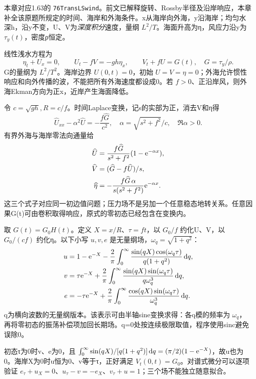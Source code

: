 本章对应1.63的 \texttt{76TransLSwind}。前文已解释旋转、Rossby半径及沿岸响应，本章补全该原题所规定的时间、海岸和外海条件。x从海岸向外海，y沿海岸；均匀水深h，沿y不变，U、V为\emph{深度积分}速度，量纲 $L^2/T$。海面升高为η，风应力沿y为 $\tau_y(t)$，密度ρ恒定。

线性浅水方程为
\[
 \eta_t+U_x=0,\qquad U_t-fV=-gh\eta_x,
 \qquad V_t+fU=G(t),\quad G=\tau_y/\rho.
\]
G的量纲为 $L^2/T^2$。海岸边界 $U(0,t)=0$，初始 $U=V=\eta=0$；外海允许惯性响应和向外传播的波，不能把所有外海速度都设成0。若 $f>0$、正沿岸风，则外海Ekman方向为正x，近岸产生海面降低。

令 $c=\sqrt{gh},R=c/f$。时间Laplace变换，记s的实部为正，消去V和η得
\[
 \widehat U_{xx}-\alpha^2\widehat U=-\frac{f\widehat G}{c^2},\quad
 \alpha=\sqrt{s^2+f^2}/c,\quad\Re\alpha>0.
\]
有界外海与海岸零法向通量给
\begin{align*}
 \widehat U&=\frac{f\widehat G}{s^2+f^2}(1-\mathrm e^{-\alpha x}),\\
 \widehat V&=(\widehat G-f\widehat U)/s,\\
 \widehat\eta&=-\frac{f\widehat G\,\alpha}{s(s^2+f^2)}\mathrm e^{-\alpha x}.
\end{align*}
这三个式子对应同一初边值问题；压力场不是另加一个任意稳态地转关系。任意因果G(t)可由卷积取得响应，原式的零初态已经包含在变换内。

取 $G(t)=G_0H(t)$。定义 $X=x/R$、$\tau=ft$，以 $G_0/f$ 约化U、V，以 $G_0/(cf)$ 约化η。以下小写 $u,v,e$ 是无量纲场，$\omega_q=\sqrt{1+q^2}$：
\begin{align*}
 u&=1-\mathrm e^{-X}-\frac2\pi\int_0^\infty
        \frac{\sin(qX)\cos(\omega_q\tau)}{q(1+q^2)}\,\mathrm d q,\\
 v&=\tau\mathrm e^{-X}+\frac2\pi\int_0^\infty
        \frac{\sin(qX)\sin(\omega_q\tau)}{q\omega_q^3}\,\mathrm d q,\\
 e&=-\tau\mathrm e^{-X}+\frac2\pi\int_0^\infty
        \frac{\cos(qX)\sin(\omega_q\tau)}{\omega_q^3}\,\mathrm d q.
\end{align*}
q为横向波数的无量纲版本。该表示可由半轴sine变换求得：各q模的频率为 $\omega_q$，再将零初态的振荡补偿项加回长期场。q=0处按连续极限取值，程序使用sinc避免误除0。

初态τ为0时v、e为0，且 $\int_0^\infty\sin(qX)/[q(1+q^2)]\,\mathrm d q=(\pi/2)(1-\mathrm e^{-X})$，故u也为0。海岸X为0时u恒为0、v等于τ，正好满足 $V_t(0,t)=G_0$。对谱式微分可以逐项验证 $e_\tau+u_X=0$、$u_\tau-v=-e_X$、$v_\tau+u=1$；三个场不能独立随意拟合。


